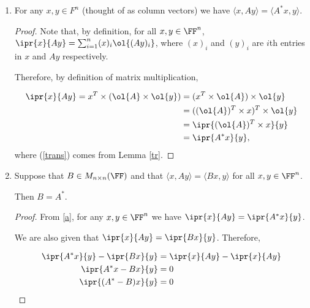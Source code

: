 \documentclass[11pt]{scrartcl}
\begin{document}
\begin{enumerate}[label=\alph*)]
\item
  \label{a}
  \begin{claim*}\hfill
    
    For any $x, y \in F^n$ (thought of as column vectors) we have
    $\langle x, Ay \rangle = \langle A^* x,y\rangle$.
  \end{claim*}

  \begin{proof}\hfill
    
    Note that, by definition, for all $x, y\in \FF^n$, $\ipr{x}{Ay}=\sum_{i=1}^n(x)_i\ol{(Ay)_{i}}$, where $(x)_i$ and $(y)_i$ are $i$th entries in $x$ and $Ay$ respectively.

    Therefore, by definition of matrix multiplication,

    \begin{align}
      \ipr{x}{Ay}=x^T\times (\ol{A}\times\ol{y}) & = (x^T\times \ol{A})\times \ol{y}    \\
      \label{trans}
                                                 & = ((\ol{A})^T\times x)^T\times\ol{y} \\
                                                 & = \ipr{(\ol{A})^T\times x}{y}        \\
                                                 & = \ipr{A^{*}x}{y},
    \end{align}
    where (\ref{trans}) comes from Lemma \ref{tr}.
  \end{proof}
\item
  \begin{claim*}\hfill
    
    Suppose that $B\in M_{n\times n}(\FF)$ and that
    $ \langle x, Ay \rangle = \langle B x,y\rangle$
    for all $x, y \in \FF^n$.

    Then $B = A^*$.
  \end{claim*}

  \begin{proof}
    From \ref{a}, for any $x,y\in\FF^{n}$ we have $\ipr{x}{Ay} = \ipr{A^{*}x}{y}$.

    We are also given that $\ipr{x}{Ay} = \ipr{Bx}{y}$. Therefore,

    \begin{align}
      \ipr{A^{*}x}{y} - \ipr{Bx}{y} & = \ipr{x}{Ay} - \ipr{x}{Ay} \\
      \ipr{A^{*}x - Bx}{y}          & = 0                         \\
      \ipr{(A^{*}-B)x}{y}           & = 0
    \end{align}
  \end{proof}


\end{enumerate}
\end{document}

